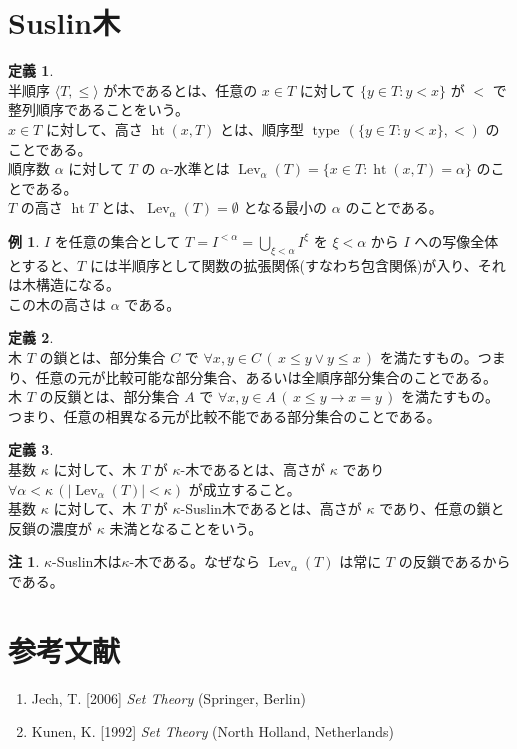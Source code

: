 \documentclass{jsarticle}
\theoremstyle{definition}
\newtheorem*{definition*}{定義}
\newtheorem{remark}{注}[section]
\newtheorem{example}{例}[section]
\begin{document}
    \section{Suslin木}
    \begin{definition*} \ \\
        半順序 $\langle T, \leq \rangle$ が木であるとは、任意の $x \in T$ に対して $\{y \in T : y < x\}$ が $<$ で整列順序であることをいう。\\
        $x \in T$ に対して、高さ $\operatorname{ht}(x, T)$ とは、順序型 $\operatorname{type}\,(\{y \in T : y < x\}, <)$ のことである。\\
        順序数 $\alpha$ に対して $T$ の $\alpha$-水準とは $\operatorname{Lev}_\alpha(T) = \{x \in T : \operatorname{ht}(x, T) = \alpha\}$ のことである。\\
        $T$ の高さ $\operatorname{ht} T$ とは、$\operatorname{Lev}_\alpha(T) = \emptyset$ となる最小の $\alpha$ のことである。
    \end{definition*}
    \begin{example}
        $I$ を任意の集合として $\displaystyle T = I^{<\alpha} = \bigcup_{\xi < \alpha} I^\xi$ を $\xi < \alpha$ から $I$ への写像全体とすると、$T$ には半順序として関数の拡張関係(すなわち包含関係)が入り、それは木構造になる。\\
        この木の高さは $\alpha$ である。
    \end{example}
    
    \vspace{0.5ex}
    
    \begin{definition*} \ \\
        木 $T$ の鎖とは、部分集合 $C$ で $\forall x,y \in C \, (\,x \leq y \lor y \leq x\,)$ を満たすもの。つまり、任意の元が比較可能な部分集合、あるいは全順序部分集合のことである。\\
        木 $T$ の反鎖とは、部分集合 $A$ で $\forall x,y \in A \, (\,x \leq y \rightarrow x = y\,)$ を満たすもの。つまり、任意の相異なる元が比較不能である部分集合のことである。
    \end{definition*}
    \begin{definition*} \ \\
        基数 $\kappa$ に対して、木 $T$ が $\kappa$-木であるとは、高さが $\kappa$ であり $\forall \alpha < \kappa \, (|\operatorname{Lev}_\alpha(T)| < \kappa)$ が成立すること。\\
        基数 $\kappa$ に対して、木 $T$ が $\kappa$-Suslin木であるとは、高さが $\kappa$ であり、任意の鎖と反鎖の濃度が $\kappa$ 未満となることをいう。
    \end{definition*}
    \begin{remark}
        $\kappa$-Suslin木は$\kappa$-木である。なぜなら $\operatorname{Lev}_\alpha(T)$ は常に $T$ の反鎖であるからである。
    \end{remark}
    
    \section{参考文献}
    \begin{enumerate}[]
        \item Jech, T. [2006] {\it Set Theory} (Springer, Berlin)
        \item Kunen, K. [1992] {\it Set Theory} (North Holland, Netherlands)
    \end{enumerate}
\end{document}
